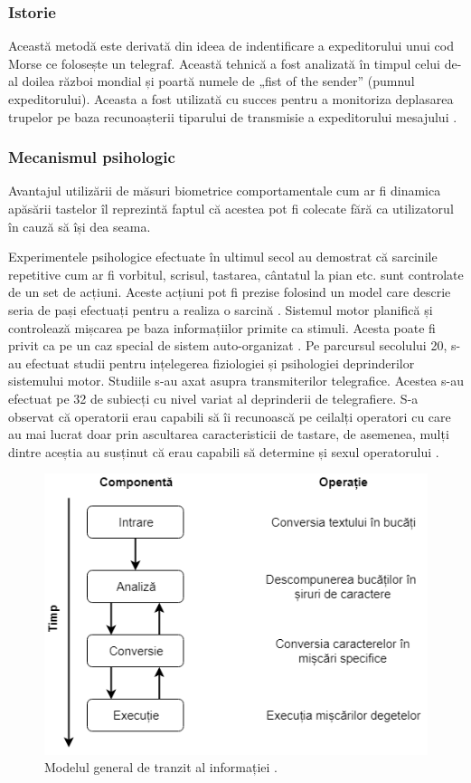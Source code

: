 \documentclass[9pt,shortpaper,twoside,web]{ieeecolor}
\begin{document}
\subsubsection{Istorie}	
	Această metodă este derivată din ideea de indentificare a expeditorului unui cod Morse ce folosește un telegraf. Această tehnică a fost analizată în timpul celui de-al doilea război mondial și poartă numele de „fist of the sender” (pumnul expeditorului). Aceasta a fost utilizată cu succes pentru a monitoriza deplasarea trupelor pe baza recunoașterii tiparului de transmisie a expeditorului mesajului \cite{b2}.


\subsubsection{Mecanismul psihologic}
	Avantajul utilizării de măsuri biometrice comportamentale cum ar fi dinamica apăsării tastelor îl reprezintă faptul că acestea pot fi colecate fără ca utilizatorul în cauză să își dea seama. 
	
	Experimentele psihologice efectuate în ultimul secol au demostrat că sarcinile repetitive cum ar fi vorbitul, scrisul, tastarea, cântatul la pian etc. sunt controlate de un set de acțiuni. Aceste acțiuni pot fi prezise folosind un model care descrie seria de pași efectuați pentru a realiza o sarcină \cite{b3}. Sistemul motor planifică și controlează mișcarea pe baza informațiilor primite ca stimuli. Acesta poate fi privit ca pe un caz special de sistem auto-organizat \cite{4}. Pe parcursul secolului 20, s-au efectuat studii pentru ințelegerea fiziologiei și psihologiei deprinderilor sistemului motor. Studiile s-au axat asupra transmiterilor telegrafice. Acestea s-au efectuat pe 32 de subiecți cu nivel variat al deprinderii de telegrafiere. S-a observat că operatorii erau capabili să îi recunoască pe ceilalți operatori cu care au mai lucrat doar prin ascultarea caracteristicii de tastare, de asemenea, mulți dintre aceștia au susținut că erau capabili să determine și sexul operatorului \cite{b3}. 
	
\begin{figure}[htb]
\includegraphics[width=0.9\columnwidth]{res/fig/modelul-cooper}
\caption{Modelul general de tranzit al informației \cite{b5}.}
\label{fig1}
\end{figure}
\end{document}
